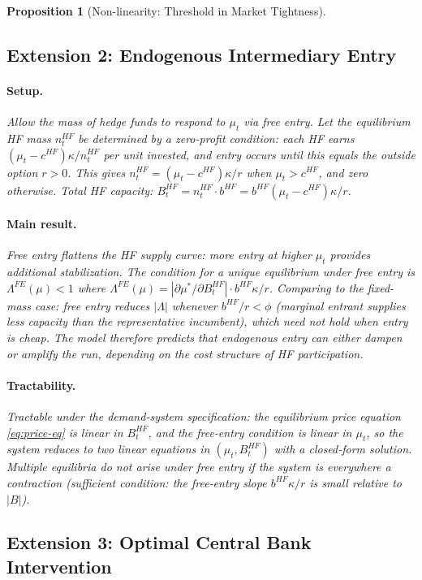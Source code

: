\documentclass[12pt]{article}
\newtheorem{proposition}{Proposition}
\theoremstyle{definition}
\newcommand{\1}[1]{\mathds{1}\left[#1\right]}
\begin{document}
\begin{proposition}[Non-linearity: Threshold in Market Tightness]
\subsection{Extension 2: Endogenous Intermediary Entry}

\paragraph{Setup.} Allow the mass of hedge funds to respond to $\mu_t$ via
free entry. Let the equilibrium HF mass $n_t^{HF}$ be determined by a
zero-profit condition: each HF earns $(\mu_t - c^{HF})\kappa/n_t^{HF}$ per
unit invested, and entry occurs until this equals the outside option $r > 0$.
This gives $n_t^{HF} = (\mu_t - c^{HF})\kappa/r$ when $\mu_t > c^{HF}$, and
zero otherwise. Total HF capacity: $B_t^{HF} = n_t^{HF} \cdot b^{HF} =
b^{HF}(\mu_t - c^{HF})\kappa/r$.

\paragraph{Main result.} Free entry flattens the HF supply curve: more entry
at higher $\mu_t$ provides additional stabilization. The condition for a
unique equilibrium under free entry is $\Lambda^{FE}(\mu) < 1$ where
$\Lambda^{FE}(\mu) = |\partial\mu^*/\partial B_t^{HF}|\cdot b^{HF}\kappa/r$.
Comparing to the fixed-mass case: free entry reduces $|\Lambda|$ whenever
$b^{HF}/r < \phi$ (marginal entrant supplies less capacity than the
representative incumbent), which need not hold when entry is cheap. The
model therefore predicts that endogenous entry can either dampen or amplify
the run, depending on the cost structure of HF participation.

\paragraph{Tractability.} Tractable under the demand-system specification:
the equilibrium price equation \eqref{eq:price-eq} is linear in $B_t^{HF}$,
and the free-entry condition is linear in $\mu_t$, so the system reduces to
two linear equations in $(\mu_t, B_t^{HF})$ with a closed-form solution.
Multiple equilibria do not arise under free entry if the system is everywhere
a contraction (sufficient condition: the free-entry slope $b^{HF}\kappa/r$
is small relative to $|B|$).

\subsection{Extension 3: Optimal Central Bank Intervention}


\end{proposition}
\end{document}
